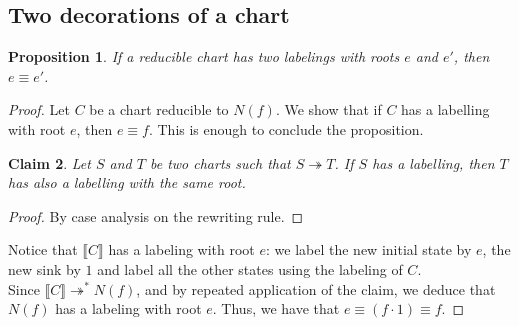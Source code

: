 \documentclass{article}
\newtheorem{definition}{Definition}[section]
\newtheorem{lemma}[definition]{Lemma}
\newtheorem{proposition}[definition]{Proposition}
\newtheorem{claim}[definition]{Claim}
\begin{document}





     \subsection{Two decorations of a chart}

  

\begin{proposition}
   If a reducible chart has two labelings with roots $e$ and $e'$, then $e \equiv e'$.~\label{prop:two-decorations-implies-equiv}
\end{proposition}
\begin{proof} Let $C$ be a chart reducible to $N(f)$. We show that if $C$ has a labelling with root $e$, then $e\equiv f$.  This is enough to conclude the proposition. 
  
 

  \begin{claim} Let $S$ and $T$ be two charts such that $S \twoheadrightarrow T$. 
    If $S$ has a labelling, then $T$ has also a labelling with the same root.
  \end{claim}
\begin{proof}
  By case analysis on the rewriting rule.
\end{proof}

 Notice that $\llbracket C\rrbracket$ has a labeling with root $e$: we label the new initial state by $e$, the new sink by $1$ and label all the other states using the labeling of $C$.~\\

Since $\llbracket C\rrbracket \twoheadrightarrow^* N(f)$, and  by repeated application of the claim, we deduce that $N(f)$ has a labeling with root $e$.  Thus, we have that $e\equiv (f\cdot 1)\equiv f$.
\end{proof}
\end{document}
